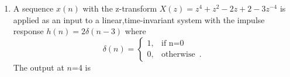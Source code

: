 \documentclass[journal,12pt,twocolumn]{IEEEtran}
\begin{document}
\begin{enumerate}

%


\item A sequence $x(n)$ with the z-transform $X(z)=z^{4}+z^{2}-2z+2-3z^{-4}$ is applied as an input to a linear,time-invariant system with the impulse response $h(n)=2\delta(n-3)$ where
\[
	\delta(n)=\begin{cases}
		1, & \text{if n=0 }  \\
		0, & \text{otherwise }\,.
	\end{cases}
\]
The output at $n$=4 is
\begin{enumerate}[(A)]
\end{enumerate}


\end{enumerate}
\end{document}
